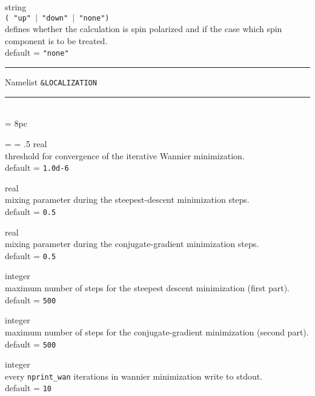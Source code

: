{\noindent{}%
{\sc string} \\  {\tt ( "up" $\mid$ "down" $\mid$ "none")}\\
defines whether the calculation is spin polarized and if the case
which spin component is to be treated.\\ 
{\sc default} = {\tt "none"} \par
}\bigskip

\begin{centering}
\rule{2.2in}{0.01in} Namelist {\tt \&LOCALIZATION} \rule{2.2in}{0.01in}
\end{centering}\\

\newdimen\descindent \descindent = 8pc
{\noindent \leftskip = \descindent \parskip = .5\baselineskip
{}%
{\sc real} \\ threshold for convergence of the iterative Wannier minimization.
\\ {\sc default} = {\tt 1.0d-6} \par

\noindent{}%
{\sc real} \\ mixing parameter during the steepest-descent minimization steps. \\
{\sc default} = {\tt 0.5} \par

\noindent{}%
{\sc real} \\ mixing parameter during the conjugate-gradient minimization steps. \\ 
{\sc default} = {\tt 0.5} \par

\noindent{}%
{\sc integer} \\ maximum number of steps for the steepest descent 
minimization (first part).\\ {\sc default} = {\tt 500} \par

\noindent{}%
{\sc integer} \\ maximum number of steps for the conjugate-gradient minimization
(second part).\\ {\sc default} = {\tt 500 }\par

\noindent{}%
{\sc integer} \\ every {\tt nprint\_wan} iterations in wannier minimization write to stdout.\\ 
{\sc default} = {\tt 10 }\par

}
